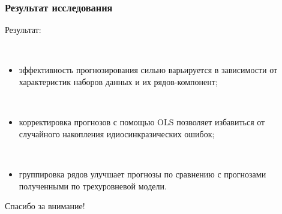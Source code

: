 \documentclass[c, dvipsnames]{beamer}  %
\begin{document}
\begin{frame}[shrink=3]
\frametitle{Результат исследования} 


\begin{block}{Результат:}

\

	\begin{itemize}


\item  эффективность прогнозирования сильно варьируется в зависимости от характеристик наборов данных и их  рядов-компонент;

\

\item  корректировка прогнозов с помощью OLS позволяет избавиться от случайного накопления идиосинкразических ошибок;

\

\item  группировка рядов  улучшает прогнозы  по сравнению с прогнозами полученными по трехуровневой модели. 		


	\end{itemize}
	
\end{block}




\end{frame}








\begin{frame}[c, plain]
\begin{center}
	
	\bigskip
	
	
	{\LARGE Спасибо за внимание!}
	
	\bigskip
	
	{\Large \inserttitle}
	
	\bigskip
	
	{\insertauthor} 
	
	\bigskip
	
	\bigskip\bigskip
	
	{\large \insertdate}
\end{center}
\end{frame}
\end{document}
